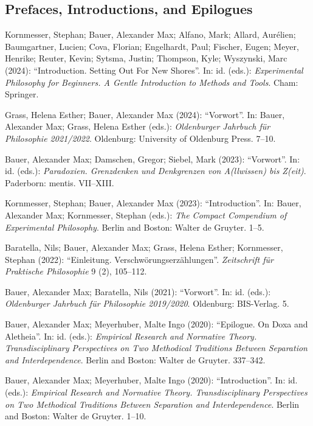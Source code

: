 \documentclass[a4paper,10pt]{article}
\newenvironment{literature}{%
   \parskip6pt\parindent0pt\raggedright
   \def\lititem{\hangindent=1cm\hangafter1}}{%
   \par\ignorespaces}
\begin{document}
\subsection*{Prefaces, Introductions, and Epilogues}
\begin{literature}
\lititem Kornmesser, Stephan; Bauer, Alexander Max; Alfano, Mark; Allard, Aurélien; Baumgartner, Lucien; Cova, Florian; Engelhardt, Paul; Fischer, Eugen; Meyer, Henrike; Reuter, Kevin; Sytsma, Justin; Thompson, Kyle; Wyszynski, Marc (2024): \enquote{Introduction. Setting Out For New Shores}. In: id. (eds.): \textit{Experimental Philosophy for Beginners. A Gentle Introduction to Methods and Tools}. Cham: Springer.

\lititem Grass, Helena Esther; Bauer, Alexander Max (2024): \enquote{Vorwort}. In: Bauer, Alexander Max; Grass, Helena Esther (eds.): \textit{Oldenburger Jahrbuch für Philosophie 2021/2022}. Oldenburg: University of Oldenburg Press. 7--10.

\lititem Bauer, Alexander Max; Damschen, Gregor; Siebel, Mark (2023): \enquote{Vorwort}. In: id. (eds.): \textit{Paradoxien. Grenzdenken und Denkgrenzen von A(llwissen) bis Z(eit)}. Paderborn: mentis. VII--XIII.

\lititem Kornmesser, Stephan; Bauer, Alexander Max (2023): \enquote{Introduction}. In: Bauer, Alexander Max; Kornmesser, Stephan (eds.): \textit{The Compact Compendium of Experimental Philosophy}. Berlin and Boston: Walter de Gruyter. 1--5.

\lititem Baratella, Nils; Bauer, Alexander Max; Grass, Helena Esther; Kornmesser, Stephan (2022): \enquote{Einleitung. Verschwörungserzählungen}. \textit{Zeitschrift für Praktische Philosophie} 9 (2), 105--112.

\lititem Bauer, Alexander Max; Baratella, Nils (2021): \enquote{Vorwort}. In: id. (eds.): \textit{Oldenburger Jahrbuch für Philosophie 2019/2020}. Oldenburg: BIS-Verlag. 5.

\lititem Bauer, Alexander Max; Meyerhuber, Malte Ingo (2020): \enquote{Epilogue. On Doxa and Aletheia}. In: id. (eds.): \textit{Empirical Research and Normative Theory. Transdisciplinary Perspectives on Two Methodical Traditions Between Separation and Interdependence}. Berlin and Boston: Walter de Gruyter. 337--342.

\lititem Bauer, Alexander Max; Meyerhuber, Malte Ingo (2020): \enquote{Introduction}. In: id. (eds.): \textit{Empirical Research and Normative Theory. Transdisciplinary Perspectives on Two Methodical Traditions Between Separation and Interdependence}. Berlin and Boston: Walter de Gruyter. 1--10.


\end{literature}
\end{document}
